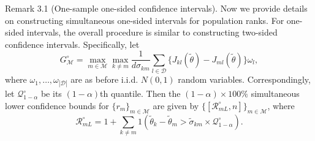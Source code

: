 Remark 3.1 (One-sample one-sided confidence intervals). Now we provide details on constructing simultaneous one-sided intervals for population ranks. For one-sided intervals, the overall procedure is similar to constructing two-sided confidence intervals. Specifically, let
\[
G_{\mathcal{M}}^{\circ} = \max_{m \in \mathcal{M}} \max_{k \neq m} \frac{1}{d \sigma_{km}} \sum_{l \in \mathcal{D}} \{J_{kl}(\widetilde{\theta}) - J_{ml}(\widetilde{\theta})\} \omega_{l}, \tag{3.16}
\]
where \(\omega_{1}, \ldots , \omega_{|\mathcal{D}|}\) are as before i.i.d. \(N(0,1)\) random variables. Correspondingly, let \(\mathcal{Q}_{1 - \alpha}^{\circ}\) be its \((1 - \alpha)\)th quantile. Then the \((1 - \alpha) \times 100\%\) simultaneous lower confidence bounds for \(\{r_{m}\}_{m \in \mathcal{M}}\) are given by \(\{[\mathcal{R}_{mL}^{ \circ }, n] \}_{m \in \mathcal{M}}\), where
\[
\mathcal{R}_{mL}^{\circ} = 1 + \sum_{k \neq m} 1 \left(\widetilde{\theta}_{k} - \widetilde{\theta}_{m} > \widetilde{\sigma}_{km} \times \mathcal{Q}_{1 - \alpha}^{\circ}\right). \tag{3.17}
\]

